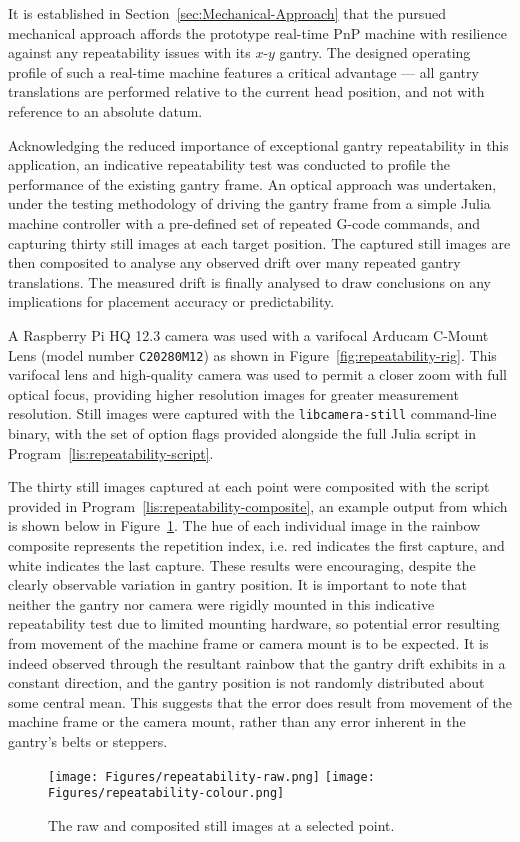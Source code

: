 \documentclass[12pt,british,UKenglish]{article}
\begin{document}
It is established in Section~\ref{sec:Mechanical-Approach} that the pursued mechanical approach affords the prototype real-time \ac{PnP} machine with resilience against any repeatability issues with its $x$-$y$ gantry.
The designed operating profile of such a real-time machine features a critical advantage --- all gantry translations are performed relative to the current head position, and not with reference to an absolute datum.

Acknowledging the reduced importance of exceptional gantry repeatability in this application, an indicative repeatability test was conducted to profile the performance of the existing gantry frame.
An optical approach was undertaken, under the testing methodology of driving the gantry frame from a simple Julia machine controller with a pre-defined set of repeated G-code commands, and capturing thirty still images at each target position.
The captured still images are then composited to analyse any observed drift over many repeated gantry translations.
The measured drift is finally analysed to draw conclusions on any implications for placement accuracy or predictability.

A Raspberry Pi HQ \qty{12.3}{\megapixel} camera was used with a varifocal Arducam C-Mount Lens (model number \texttt{C20280M12}) as shown in Figure~\ref{fig:repeatability-rig}.
This varifocal lens and high-quality camera was used to permit a closer zoom with full optical focus, providing higher resolution images for greater measurement resolution.
Still images were captured with the \texttt{libcamera-still} command-line binary, with the set of option flags provided alongside the full Julia script in Program~\ref{lis:repeatability-script}.

The thirty still images captured at each point were composited with the script provided in Program~\ref{lis:repeatability-composite}, an example output from which is shown below in Figure~\ref{fig:repeatability-composite}.
The hue of each individual image in the rainbow composite represents the repetition index, i.e. red indicates the first capture, and white indicates the last capture.
These results were encouraging, despite the clearly observable variation in gantry position.
It is important to note that neither the gantry nor camera were rigidly mounted in this indicative repeatability test due to limited mounting hardware, so potential error resulting from movement of the machine frame or camera mount is to be expected.
It is indeed observed through the resultant rainbow that the gantry drift exhibits in a constant direction, and the gantry position is not randomly distributed about some central mean.
This suggests that the error does result from movement of the machine frame or the camera mount, rather than any error inherent in the gantry's belts or steppers.
\begin{figure}[hbtp]
    \texttt{[image: Figures/repeatability-raw.png]}
    \texttt{[image: Figures/repeatability-colour.png]}
    \centering
    \caption{The raw and composited still images at a selected point.}
    \label{fig:repeatability-composite}
\end{figure}
\end{document}
